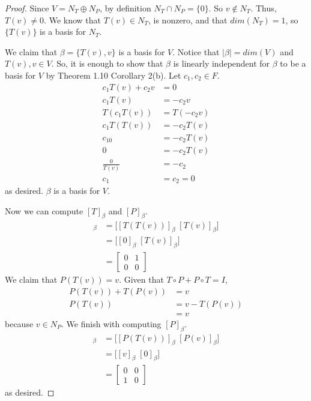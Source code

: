 \documentclass[11pt]{scrartcl}
\begin{document}
\begin{enumerate}[label=\alph*.]
{\begin{proof}
		      Since $V = N_T \oplus N_P$, by definition $N_T \cap N_P = \{0\}$. So $v \notin N_T$. Thus, $T(v) \neq 0$.
		      We know that $T(v) \in N_T$, is nonzero, and that $dim(N_T) = 1$, so $\{T(v)\}$ is a basis for $N_T$.\par

		      We claim that $\beta = \{T(v), v\}$ is a basis for $V$. Notice that $|\beta| = dim(V)$ and $T(v), v \in V$.
		      So, it is enough to show that $\beta$ is linearly independent for $\beta$ to be a basis for $V$
		      by Theorem 1.10 Corollary 2(b). Let $c_1, c_2 \in F$.
		      \begin{align*}
			      c_1T(v) +  c_2v & = 0        \\
			      c_1T(v)         & = - c_2v   \\
			      T(c_1T(v))      & = T(-c_2v) \\
			      c_1T(T(v))      & = -c_2T(v) \\
			      c_10            & = -c_2T(v) \\
			      0               & = -c_2T(v) \\
			      \frac{0}{T(v)}  & = -c_2     \\
			      c_1             & = c_2 = 0
		      \end{align*}
		      as desired. $\beta$ is a basis for $V$. \par
		      Now we can compute $[T]_{\beta}$ and $[P]_{\beta}$.
		      \begin{align*}
			      [T]_{\beta} & = \Big[[T(T(v))]_{\beta} \; [T(v)]_{\beta}\Big] \\
			                  & = \Big[[0]_{\beta} \; [T(v)]_{\beta}\Big]       \\
			                  & = \left [ \begin{array}{cc}
					      0 & 1 \\
					      0 & 0
				      \end{array} \right]
		      \end{align*}
		      We claim that $P(T(v)) = v$. Given that $T \circ P + P \circ T = I$,
		      \begin{align*}
			      P(T(v)) + T(P(v)) & = v           \\
			      P(T(v))           & = v - T(P(v)) \\
			                        & = v
		      \end{align*}
		      because $v \in N_P$.
		      We finish with computing $[P]_{\beta}$.
		      \begin{align*}
			      [P]_{\beta} & = \Big[[P(T(v))]_{\beta} \; [P(v)]_{\beta}\Big] \\
			                  & = \Big[[v]_{\beta} \;  [0]_{\beta}\Big]         \\
			                  & = \left [ \begin{array}{cc}
					      0 & 0 \\
					      1 & 0
				      \end{array} \right]
		      \end{align*}
		      as desired.
	      \end{proof}
	      }
\end{enumerate}
\end{document}
